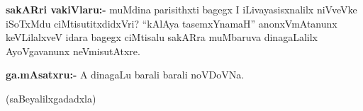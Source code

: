 \smallskip
\noindent
\textbf{sakARri vakiVlaru:-} muMdina parisithxti bagegx I iLivayasisxnalilx niVveVke iSoTxMdu ciMtisutitxdidxVri? ``kAlAya tasemxYnamaH'' anonxVmAtanunx keVLilalxveV idara bagegx ciMtisalu sakARra muMbaruva dinagaLalilx AyoVgavanunx neVmisutAtxre.

\smallskip
\noindent
\textbf{ga.mAsatxru:-} A dinagaLu barali barali noVDoVNa.

\begin{center}
(saBeyalilxgadadxla)
\end{center}
